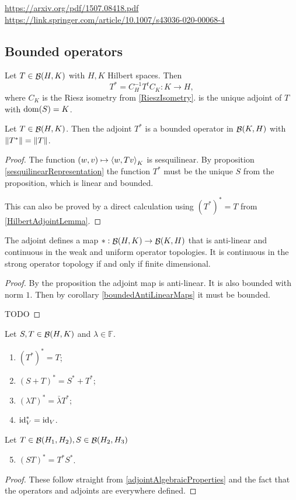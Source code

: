 \url{https://arxiv.org/pdf/1507.08418.pdf}
\url{https://link.springer.com/article/10.1007/s43036-020-00068-4}

\subsection{Bounded operators}
\begin{proposition}
Let $T\in\mathop{\mathcal{B}}(H,K)$ with $H,K$ Hilbert spaces. Then
\[ T^* = C_H^{-1}T^tC_K: K\to H, \]
where $C_K$ is the Riesz isometry from \ref{RieszIsometry}.
is the unique adjoint of $T$ with $\operatorname{dom}(S) = K$.
\end{proposition}

\begin{lemma}
Let $T\in\mathop{\mathcal{B}}(H,K)$. Then the adjoint $T^*$ is a bounded operator in $\mathop{\mathcal{B}}(K,H)$ with $\lVert T^*\rVert = \lVert T\rVert$.
\end{lemma}
\begin{proof}
The function $(w,v)\mapsto \left\langle w,Tv \right\rangle_K$ is sesquilinear. By proposition \ref{sesquilinearRepresentation} the function $T^*$ must be the unique $S$ from the proposition, which is linear and bounded.

This can also be proved by a direct calculation using $(T^*)^* = T$ from \ref{HilbertAdjointLemma}.
\end{proof}

\begin{lemma}
The adjoint defines a map $*:\mathop{\mathcal{B}}(H,K)\to \mathop{\mathcal{B}}(K,H)$ that is anti-linear and continuous in the weak and uniform operator topologies. It is continuous in the strong operator topology \textup{if and only if} finite dimensional.
\end{lemma}
\begin{proof}
By the proposition the adjoint map is anti-linear. It is also bounded with norm $1$. Then by corollary \ref{boundedAntiLinearMaps} it must be bounded.

TODO
\end{proof}

\begin{lemma} \label{HilbertAdjointLemma}
Let $S,T\in\mathop{\mathcal{B}}(H,K)$ and $\lambda \in \mathbb{F}$.
\begin{enumerate}
\item $(T^*)^* = T$;
\item $(S+T)^* = S^* + T^*$;
\item $(\lambda T)^* = \bar{\lambda}T^*$;
\item $\operatorname{id}_V^* = \operatorname{id}_V$.
\end{enumerate}
Let $T\in\mathop{\mathcal{B}}(H_1,H_2), S\in\mathop{\mathcal{B}}(H_2,H_3)$
\begin{enumerate}
\setcounter{enumi}{4}
\item $(ST)^* = T^*S^*$.
\end{enumerate}
\end{lemma}
\begin{proof}
These follow straight from \ref{adjointAlgebraicProperties} and the fact that the operators and adjoints are everywhere defined.
\end{proof}

